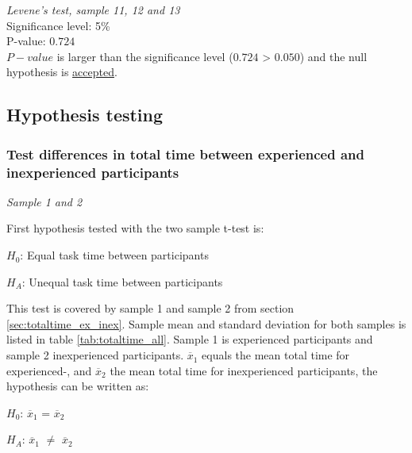  \begin{center}
	\begin{tcolorbox}[box align=center,width=\textwidth-5cm]
		\centering
		\textit{Levene's test, sample 11, 12 and 13}\\
		Significance level: 5\%  \\[0.5cm]
		
		P-value: $0.724$\\[0.2cm]
		
		$P-value$ is larger than the significance level ($0.724$ > $0.050$) and the null hypothesis is \underline{accepted}.\\[0.5cm]
	\end{tcolorbox} 
\end{center}

\subsection{Hypothesis testing}\label{sec:hypothesis_results}

\subsubsection[Sample 1, 2]{Test differences in total time between experienced and inexperienced participants}\label{sec:t-test_result} %

\textit{Sample 1 and 2}\newline

First hypothesis tested with the two sample t-test is: \\[0.3cm]

\centerline{$H_{0}$: Equal task time between participants} 
\centerline{$H_{A}$: Unequal task time between participants}

\vspace{0.3cm}

This test is covered by sample 1 and sample 2 from section \ref{sec:totaltime_ex_inex}. Sample mean and standard deviation for both samples is listed in table \ref{tab:totaltime_all}. Sample 1 is experienced participants and sample 2 inexperienced participants. $\overline{x}_1$ equals the mean total time for experienced-, and $\overline{x}_2$ the mean total time for inexperienced participants, the hypothesis can be written as:\\[0.3cm]

\centerline{$H_{0}$: $\overline{x}_1$ = $\overline{x}_2$} 
\centerline{$H_{A}$: $\overline{x}_1$ $\neq$ $\overline{x}_2$}


